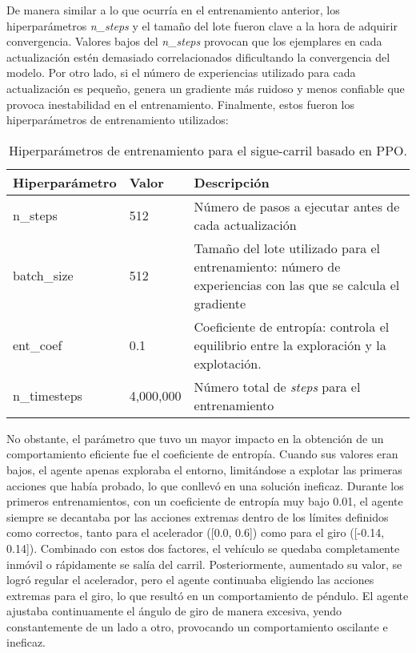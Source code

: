 De manera similar a lo que ocurría en el entrenamiento anterior, los hiperparámetros \textit{n\_steps} y el tamaño del lote fueron clave a la hora de adquirir convergencia. Valores bajos del \textit{n\_steps} provocan que los ejemplares en cada actualización estén demasiado correlacionados dificultando la convergencia del modelo. Por otro lado, si el número de experiencias utilizado para cada actualización es pequeño, genera un gradiente más ruidoso y menos confiable que provoca inestabilidad en el entrenamiento. Finalmente, estos fueron los hiperparámetros de entrenamiento utilizados:
\begin{table}[ht]
\centering
\begin{tabular}{|l|l|p{9cm}|}
\hline
\textbf{Hiperparámetro} & \textbf{Valor} & \textbf{Descripción} \\ \hline
n\_steps & 512 & Número de pasos a ejecutar antes de cada actualización \\ \hline
batch\_size & 512 & Tamaño del lote utilizado para el entrenamiento: número de experiencias con las que se calcula el gradiente \\ \hline
ent\_coef & 0.1 & Coeficiente de entropía: controla el equilibrio entre la exploración y la explotación. \\ \hline
n\_timesteps & 4,000,000 & Número total de \textit{steps} para el entrenamiento \\ \hline
\end{tabular}
\caption{Hiperparámetros de entrenamiento para el sigue-carril basado en \ac{PPO}.}
\label{tab:hiper_params_ppo}
\end{table}

\newpage

No obstante, el parámetro que tuvo un mayor impacto en la obtención de un comportamiento eficiente fue el coeficiente de entropía. Cuando sus valores eran bajos, el agente apenas exploraba el entorno, limitándose a explotar las primeras acciones que había probado, lo que conllevó en una solución ineficaz. Durante los primeros entrenamientos, con un coeficiente de entropía muy bajo 0.01, el agente siempre se decantaba por las acciones extremas dentro de los límites definidos como correctos, tanto para el acelerador ([0.0, 0.6]) como para el giro ([-0.14, 0.14]). Combinado con estos dos factores, el vehículo se quedaba completamente inmóvil o rápidamente se salía del carril. Posteriormente, aumentado su valor, se logró regular el acelerador, pero el agente continuaba eligiendo las acciones extremas para el giro, lo que resultó en un comportamiento de péndulo. El agente ajustaba continuamente el ángulo de giro de manera excesiva, yendo constantemente de un lado a otro, provocando un comportamiento oscilante e ineficaz.

